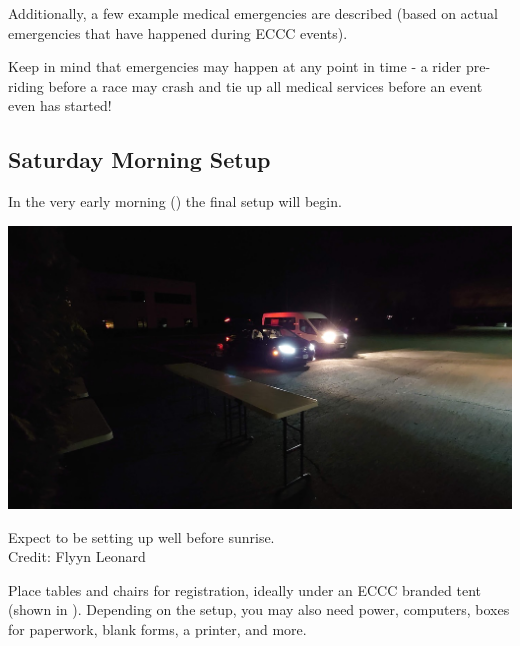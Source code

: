 \documentclass[
  letterpaper, %
  fontsize=10pt, %
  twoside=true,
  chapterentrydots=true, %
  numbers=noenddot,
  fontmethod=tex,
]{kaobook}
\begin{document}
Additionally, a few example medical emergencies are described
(based on actual emergencies that have happened during ECCC events).

Keep in mind that emergencies may happen at any point in time -
a rider pre-riding before a race may crash and tie up all medical services before an event even has started!


\subsection{Saturday Morning Setup}

In the very early morning ()
the final setup will begin.

\begin{marginfigure}[-10pt]
\includegraphics{2022_umass_early_am.jpg}
\caption[Early morning race setup]{Expect to be setting up well before sunrise.\\
          Credit: Flyyn Leonard}
\end{marginfigure}

Place tables and chairs for registration,
ideally under an ECCC branded tent (shown in ). %
Depending on the setup, you may also need power,
computers, boxes for paperwork, blank forms, a printer, and more.
\end{document}
